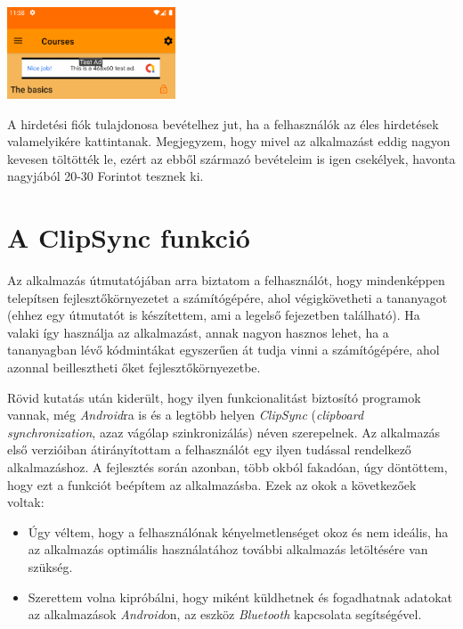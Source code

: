 \documentclass[12pt,a4paper]{article}
\begin{document}
	\begin{center}
		\includegraphics[width=5cm]{test_ad}
	\end{center}

	A hirdetési fiók tulajdonosa bevételhez jut, ha a felhasználók az éles hirdetések valamelyikére kattintanak. Megjegyzem, hogy mivel az alkalmazást eddig nagyon kevesen töltötték le, ezért az ebből származó bevételeim is igen csekélyek, havonta nagyjából 20-30 Forintot tesznek ki.

	\section{A ClipSync funkció}\label{clipsync}
	
	Az alkalmazás útmutatójában arra biztatom a felhasználót, hogy mindenképpen telepítsen fejlesztőkörnyezetet a számítógépére, ahol végigkövetheti a tananyagot (ehhez egy útmutatót is készítettem, ami a legelső fejezetben található). Ha valaki így használja az alkalmazást, annak nagyon hasznos lehet, ha a tananyagban lévő kódmintákat egyszerűen át tudja vinni a számítógépére, ahol azonnal beillesztheti őket fejlesztőkörnyezetbe.
	
	Rövid kutatás után kiderült, hogy ilyen funkcionalitást biztosító programok vannak, még \textit{Android}ra is és a legtöbb helyen \textit{ClipSync} (\textit{clipboard synchronization}, azaz vágólap szinkronizálás) néven szerepelnek. Az alkalmazás első verzióiban átirányítottam a 
	felhasználót egy ilyen tudással rendelkező alkalmazáshoz. A fejlesztés során azonban, több okból fakadóan, úgy döntöttem, hogy ezt a funkciót beépítem az alkalmazásba. Ezek az okok a következőek voltak:
	
	\begin{itemize}
		\item Úgy véltem, hogy a felhasználónak kényelmetlenséget okoz és nem ideális, ha az alkalmazás optimális használatához további alkalmazás letöltésére van szükség.
		\item Szerettem volna kipróbálni, hogy miként küldhetnek és fogadhatnak adatokat az alkalmazások \textit{Android}on, az eszköz \textit{Bluetooth} kapcsolata segítségével.
	\end{itemize} 
	
\end{document}
